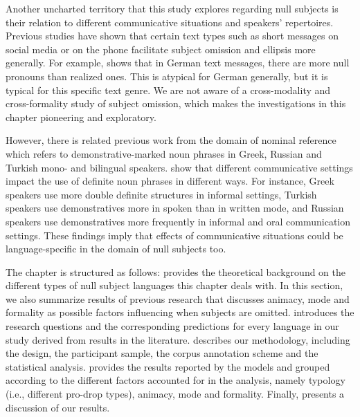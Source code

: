\documentclass[output=paper,colorlinks,citecolor=brown]{langscibook}
\begin{document}
Another uncharted territory that this study explores regarding null subjects is their relation to different communicative situations and speakers' repertoires. Previous studies have shown that certain text types such as short messages on social media or on the phone facilitate subject omission and ellipsis more generally. For example, \textcite{Frick_2017} shows that in German text messages, there are more null pronouns than realized ones. This is atypical for German generally, but it is typical for this specific text genre. We are not aware of a cross-modality and cross-formality study of subject omission, which makes the investigations in this chapter pioneering and exploratory.

However, there is related previous work from the domain of nominal reference which refers to demonstrative-marked noun phrases in Greek, Russian and Turkish mono- and bilingual speakers. \textcite{Martynova2024} show that different communicative settings impact the use of definite noun phrases in different ways. For instance, Greek speakers use more double definite structures in informal settings, Turkish speakers use demonstratives more in spoken than in written mode, and Russian speakers use demonstratives more frequently in informal and oral communication settings. These findings imply that effects of communicative situations could be language-specific in the domain of null subjects too. 

The chapter is structured as follows:  provides the theoretical background on the different types of null subject languages this chapter deals with.
In this section, we also summarize results of previous research that discusses animacy, mode and formality as possible factors influencing when subjects are omitted.
 introduces the research questions and the corresponding predictions for every language in our study derived from results in the literature.
 describes our methodology, including the design, the participant sample, the corpus annotation scheme and the statistical analysis. 
 provides the results reported by the models and grouped according to the different factors accounted for in the analysis, namely typology (i.e., different pro-drop types), animacy, mode and formality.
Finally,  presents a discussion of our results.
\end{document}
